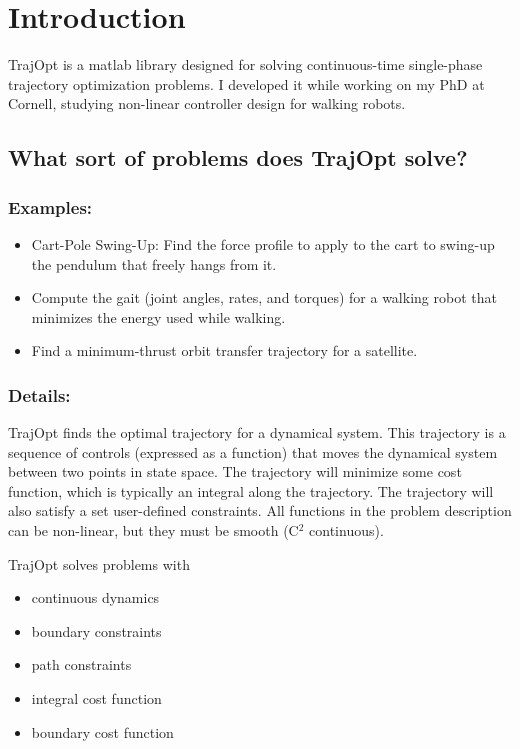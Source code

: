\section{Introduction}

TrajOpt is a matlab library designed for solving continuous-time single-phase trajectory optimization problems. I developed it while working on my PhD at Cornell, studying non-linear controller design for walking robots.

\subsection{What sort of problems does TrajOpt solve?}

\subsubsection*{Examples:}
\begin{itemize} 
\item Cart-Pole Swing-Up: Find the force profile to apply to the cart to swing-up the pendulum that freely hangs from it.
\item Compute the gait (joint angles, rates, and torques) for a walking robot that minimizes the energy used while walking.
\item Find a minimum-thrust orbit transfer trajectory for a satellite.
\end{itemize}

\subsubsection*{Details:}

TrajOpt finds the optimal trajectory for a dynamical system. This trajectory is a sequence of controls (expressed as a function) that moves the dynamical system between two points in state space. The trajectory will minimize some cost function, which is typically an integral along the trajectory. The trajectory will also satisfy a set user-defined constraints. All functions in the problem description can be non-linear, but they must be smooth (C$^2$ continuous).

TrajOpt solves problems with
\begin{itemize} \setlength\itemsep{-0.1em}
\item continuous dynamics
\item boundary constraints
\item path constraints
\item integral cost function
\item boundary cost function
\end{itemize}

